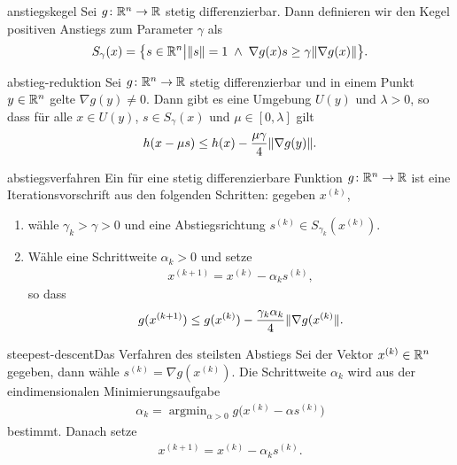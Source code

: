 \begin{Definition}{anstiegskegel}
  Sei $g\colon \mathbb R^n\to \mathbb R$ stetig differenzierbar. Dann definieren wir
  den Kegel positiven Anstiegs zum Parameter $\gamma$ als
  \begin{gather}
    S_\gamma(x) = \bigl\{ s\in\mathbb R^n \big|
    \lVert s\rVert = 1 \;\wedge \;
    \nabla g(x)s \ge \gamma\lVert\nabla g(x)\rVert
    \bigr\}.
  \end{gather}  
\end{Definition}

\begin{Lemma}{abstieg-reduktion}
  Sei $g\colon\mathbb R^n\to\mathbb R$ stetig differenzierbar und in einem Punkt
  $y\in\mathbb R^n$ gelte $\nabla g(y) \neq 0$. Dann gibt es eine Umgebung
  $U(y)$ und $\lambda>0$, so dass für alle $x\in U(y)$,
  $s\in S_\gamma(x)$ und $\mu\in [0,\lambda]$ gilt
  \begin{gather}
    h(x-\mu s) \le h(x) - \frac{\mu\gamma}4 \lVert\nabla g(y)\rVert.
  \end{gather}
\end{Lemma}

\begin{Definition}{abstiegsverfahren}
  Ein  für eine stetig differenzierbare
  Funktion $g\colon \mathbb R^n\to\mathbb R$ ist eine Iterationsvorschrift aus den
  folgenden Schritten: gegeben $x^{(k)}$,
  \begin{enumerate}
  \item wähle $\gamma_k>\gamma>0$ und eine Abstiegsrichtung
    $s^{(k)} \in S_{\gamma_k}(x^{(k)})$.
  \item Wähle eine Schrittweite $\alpha_k>0$ und setze
    \begin{gather}
      x^{(k+1)} = x^{(k)} - \alpha_k s^{(k)},
    \end{gather}
    so dass
    \begin{gather}
      g(x^{(k+1)})
      \le g(x^{(k)}) - \frac{\gamma_k\alpha_k}{4}\lVert\nabla g(x^{(k)}\rVert.
    \end{gather}
  \end{enumerate}
\end{Definition}

\begin{Beispiel*}{steepest-descent}{Das Verfahren des steilsten Abstiegs}
  Sei der Vektor $x^{(k)} \in\mathbb R^n$ gegeben, dann wähle
  $s^{(k)} = \nabla g(x^{(k)})$. Die Schrittweite $\alpha_k$ wird aus
  der eindimensionalen Minimierungsaufgabe
  \begin{gather}
    \alpha_k = \operatorname{argmin}_{\alpha>0}
    g\bigl(x^{(k)} - \alpha s^{(k)}\bigr)
  \end{gather}
  bestimmt. Danach setze
  \begin{gather}
    x^{(k+1)} = x^{(k)} - \alpha_k s^{(k)}.
  \end{gather}
\end{Beispiel*}

